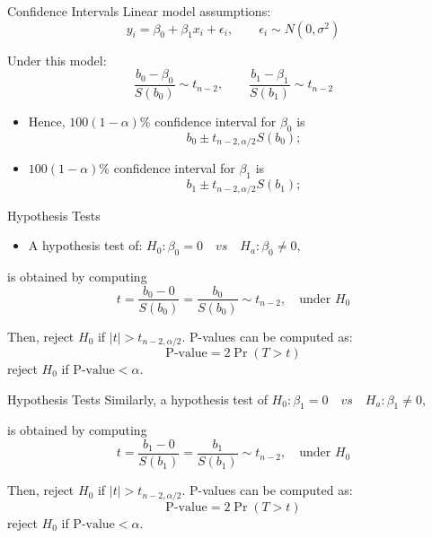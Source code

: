 \documentclass[
  ignorenonframetext,
]{beamer}
\providecommand{\tightlist}{%
  \setlength{\itemsep}{0pt}\setlength{\parskip}{0pt}}
\begin{document}
\begin{frame}{Confidence Intervals}
\protect\hypertarget{confidence-intervals}{}
Linear model assumptions:
\[y_i=\beta_0+\beta_1 x_i+\epsilon_i, \quad \quad \epsilon_i \sim N(0, \sigma^2)\]

Under this model:
\[\frac{b_0-\beta_0}{S(b_0)}\sim t_{n-2}, \quad \quad \frac{b_1-\beta_1}{S(b_1)}\sim t_{n-2}\]

\begin{itemize}
\tightlist
\item
  Hence, \(100(1-\alpha)\%\) confidence interval for \(\beta_0\) is
  \[b_0\pm t_{n-2, \alpha/2}S(b_0);\]
\item
  \(100(1-\alpha)\%\) confidence interval for \(\beta_1\) is
  \[b_1\pm t_{n-2, \alpha/2}S(b_1);\]
\end{itemize}
\end{frame}

\begin{frame}{Hypothesis Tests}
\protect\hypertarget{hypothesis-tests}{}
\begin{itemize}
\tightlist
\item
  A hypothesis test of:
  \(H_0: \beta_0=0\quad vs \quad H_a: \beta_0\neq 0\),
\end{itemize}

is obtained by computing
\[ t=\frac{b_0-0}{S(b_0)}=\frac{b_0}{S(b_0)}\sim t_{n-2}, \quad \text{under } H_0\]

Then, reject \(H_0\) if \(|t|>t_{n-2, \alpha/2}\). P-values can be
computed as: \[\text{P-value}=2\Pr(T>t)\] reject \(H_0\) if
\(\text{P-value}<\alpha\).
\end{frame}

\begin{frame}{Hypothesis Tests}
\protect\hypertarget{hypothesis-tests-1}{}
Similarly, a hypothesis test of
\(H_0: \beta_1=0\quad vs \quad H_a: \beta_1\neq0\),

is obtained by computing
\[ t=\frac{b_1-0}{S(b_1)}=\frac{b_1}{S(b_1)}\sim t_{n-2}, \quad \text{under } H_0\]

Then, reject \(H_0\) if \(|t|>t_{n-2, \alpha/2}\). P-values can be
computed as: \[\text{P-value}=2\Pr(T>t)\] reject \(H_0\) if
\(\text{P-value}<\alpha\).
\end{frame}
\end{document}
